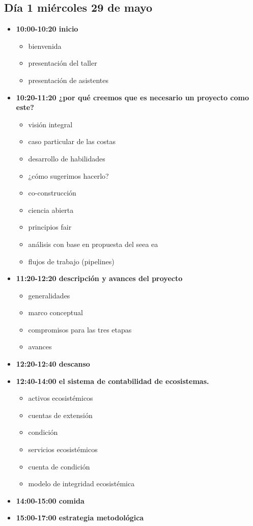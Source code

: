 \documentclass[
  letterpaper,
  DIV=11,
  numbers=noendperiod]{scrreprt}
\providecommand{\tightlist}{%
  \setlength{\itemsep}{0pt}\setlength{\parskip}{0pt}}\usepackage{longtable,booktabs,array}
\begin{document}
\subsection{Día 1 miércoles 29 de
mayo}\label{duxeda-1-miuxe9rcoles-29-de-mayo}

\begin{itemize}
\item
  \textbf{10:00-10:20 inicio }

  \begin{itemize}
  \tightlist
  \item
    bienvenida
  \item
    presentación del taller
  \item
    presentación de asistentes
  \end{itemize}
\item
  \textbf{10:20-11:20 ¿por qué creemos que es necesario un proyecto como
  este?}

  \begin{itemize}
  \tightlist
  \item
    visión integral
  \item
    caso particular de las costas
  \item
    desarrollo de habilidades
  \item
    ¿cómo sugerimos hacerlo?
  \item
    co-construcción
  \item
    ciencia abierta
  \item
    principios fair
  \item
    análisis con base en propuesta del seea ea
  \item
    flujos de trabajo (pipelines)
  \end{itemize}
\item
  \textbf{11:20-12:20 descripción y avances del proyecto}

  \begin{itemize}
  \tightlist
  \item
    generalidades
  \item
    marco conceptual
  \item
    compromisos para las tres etapas
  \item
    avances
  \end{itemize}
\item
  \textbf{12:20-12:40 descanso}
\item
  \textbf{12:40-14:00 el sistema de contabilidad de ecosistemas.}

  \begin{itemize}
  \tightlist
  \item
    activos ecosistémicos
  \item
    cuentas de extensión
  \item
    condición
  \item
    servicios ecosistémicos
  \item
    cuenta de condición
  \item
    modelo de integridad ecosistémica
  \end{itemize}
\item
  \textbf{14:00-15:00 comida}
\item
  \textbf{15:00-17:00 estrategia metodológica}


\end{itemize}
\end{document}
